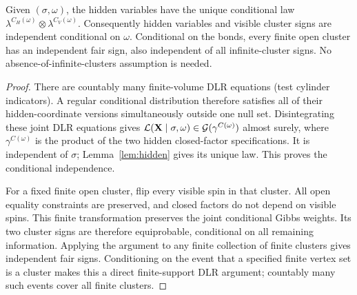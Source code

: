 \begin{lemma}\label{lem:signs}
Given \((\sigma,\omega)\), the hidden variables have the unique conditional law
\(\lambda^{C_H(\omega)}\otimes\lambda^{C_V(\omega)}\).
Consequently hidden variables and visible cluster signs are independent conditional on \(\omega\). Conditional on the bonds, every finite open cluster has an independent fair sign, also independent of all infinite-cluster signs. No absence-of-infinite-clusters assumption is needed.
\end{lemma}
\begin{proof}
There are countably many finite-volume DLR equations (test cylinder indicators). A regular conditional distribution therefore satisfies all of their hidden-coordinate versions simultaneously outside one null set. Disintegrating these joint DLR equations gives $\mathcal L(\mathbf X\mid\sigma,\omega)\in\mathcal G(\gamma^{C(\omega)})$ almost surely, where $\gamma^{C(\omega)}$ is the product of the two hidden closed-factor specifications. It is independent of \(\sigma\); Lemma~\ref{lem:hidden} gives its unique law. This proves the conditional independence.

For a fixed finite open cluster, flip every visible spin in that cluster. All open equality constraints are preserved, and closed factors do not depend on visible spins. This finite transformation preserves the joint conditional Gibbs weights. Its two cluster signs are therefore equiprobable, conditional on all remaining information. Applying the argument to any finite collection of finite clusters gives independent fair signs. Conditioning on the event that a specified finite vertex set is a cluster makes this a direct finite-support DLR argument; countably many such events cover all finite clusters.
\end{proof}

